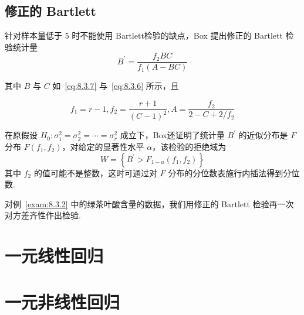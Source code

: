 \subsection{修正的 Bartlett}

针对样本量低于 5 时不能使用 Bartlett检验的缺点，Box 提出修正的 Bartlett 检验统计量
\begin{equation}\label{eq:8.3.9}
  B^{\prime}=\frac{f_{2} B C}{f_{1}(A-B C)}
\end{equation}

其中 $B$ 与 $C$ 如~\eqref{eq:8.3.7} 与~\eqref{eq:8.3.6} 所示，且

\begin{equation*}
  f_{1}=r-1, f_{2}=\frac{r+1}{(C-1)^{2}}, A=\frac{f_{2}}{2-C+2 / f_{2}}
\end{equation*}

在原假设 $H_0:\sigma^2_1=\sigma_2^2=\cdots=\sigma^2_r$ 成立下，Box还证明了统计量 $B^{\prime}$ 的近似分布是 $F$ 分布 $F(f_1,f_2)$，对给定的显著性水平 $\alpha$，该检验的拒绝域为 
\begin{equation}\label{eq:8.3.10}
  W=\left\{B^{\prime}>F_{1-a}\left(f_{1}, f_{2}\right)\right\}
\end{equation}
其中 $f_2$ 的值可能不是整数，这时可通过对 $F$ 分布的分位数表施行内插法得到分位数.


\begin{example}\label{exam:8.3.3}
对例~\ref{exam:8.3.2} 中的绿茶叶酸含量的数据，我们用修正的 Bartlett 检验再一次对方差齐性作出检验.
\end{example}
\section{一元线性回归}\label{sec:8.4}

\section{一元非线性回归}\label{sec:8.5}